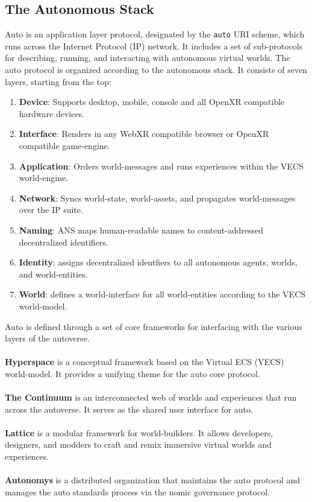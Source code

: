 \documentclass[twocolumn, 10pt]{article}
\begin{document}
\subsection{The Autonomous Stack}
Auto is an application layer protocol, designated by the \lstinline{auto} URI scheme, which runs across the Internet Protocol (IP) network. It includes a set of sub-protocols for describing, running, and interacting with autonomous virtual worlds. The auto protocol is organized according to the autonomous stack. It consists of seven layers, starting from the top:
\begin{enumerate}
    \item \textbf{Device}: Supports desktop, mobile, console and all OpenXR compatible hardware devices.
    \item \textbf{Interface}: Renders in any WebXR compatible browser or OpenXR compatible game-engine.
    \item \textbf{Application}: Orders world-messages and runs experiences within the VECS world-engine.
    \item \textbf{Network}: Syncs world-state, world-assets, and propagates world-messages over the IP suite.
    \item \textbf{Naming}: ANS maps human-readable names to content-addressed decentralized identifiers.
    \item \textbf{Identity}: assigns decentralized identfiers to all autonomous agents, worlds, and world-entities.
    \item \textbf{World}: defines a world-interface for all world-entities according to the VECS world-model.
\end{enumerate}
Auto is defined through a set of core frameworks for interfacing with the various layers of the autoverse.  
\\\\
\textbf{Hyperspace} is a conceptual framework based on the Virtual ECS (VECS) world-model. It provides a unifying theme for the auto core protocol.
\\\\
\textbf{The Continuum} is an interconnected web of worlds and experiences that run across the autoverse. It serves as the shared user interface for auto.
\\\\
\textbf{Lattice} is a modular framework for world-builders. It allows developers, designers, and modders to craft and remix immersive virtual worlds and experiences.
\\\\
\textbf{Autonomys} is a distributed organization that maintains the auto protocol and manages the auto standards process via the nomic governance protocol.
\end{document}
